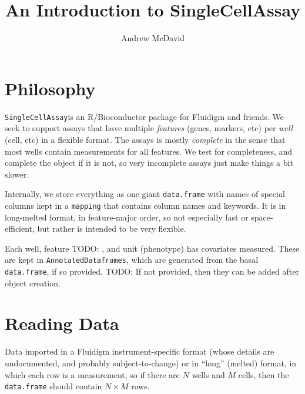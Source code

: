 \documentclass{article}\usepackage{graphicx, color}
\newcommand{\future}[1]{TODO: {\color{gray} #1}}
\newcommand{\sca}{\texttt{SingleCellAssay}}
\begin{document}
\title{An Introduction to SingleCellAssay}


\author{Andrew McDavid}

\maketitle
\section{Philosophy}
 \sca is an R/Bioconductor package for Fluidigm and friends. 
We seek to support assays that have multiple \emph{features} (genes, markers, etc) per \emph{well} (cell, etc) in a flexible format.
The assays is mostly \emph{complete} in the sense that most wells contain measurements for all features.
We test for completeness, and complete the object if it is not, so very incomplete assays just make things a bit slower. 

Internally, we store everything as one giant \texttt{data.frame} with names of special columns kept in a \texttt{mapping} that contains column names and keywords.  
It is in long-melted format, in feature-major order, so not especially fast or space-efficient, but rather is intended to be very flexible.

Each well, feature \future{, and unit (phenotype)} has covariates measured.
These are kept in \texttt{AnnotatedDataframes}, which are generated from the basal \texttt{data.frame}, if so provided.
\future{If not provided, then they can be added after object creation.}

\section{Reading Data}
Data imported in a Fluidigm instrument-specific format (whose details are undocumented, and probably subject-to-change) or in ``long'' (melted) format, in which each row is a measurement, so if there are $N$ wells and $M$ cells, then the \texttt{data.frame} should contain $N \times M$ rows.
\end{document}
